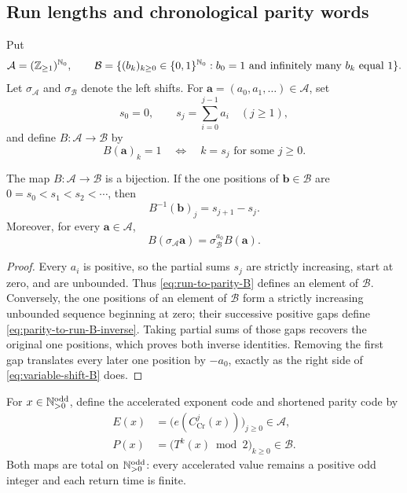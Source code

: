 \subsection{Run lengths and chronological parity words}

Put
\[
 \mathcal A=(\mathbb{Z}_{\geq1})^{\mathbb{N}_{0}},
 \qquad
 \mathcal B=\{(b_k)_{k\geq0}\in\{0,1\}^{\mathbb{N}_{0}}:
 b_0=1\text{ and infinitely many }b_k\text{ equal }1\}.
\]
Let $\sigma_{\mathcal A}$ and $\sigma_{\mathcal B}$ denote the left shifts.
For $\mathbf a=(a_0,a_1,\ldots)\in\mathcal A$, set
\[
 s_0=0,
 \qquad
 s_j=\sum_{i=0}^{j-1}a_i\quad(j\geq1),
\]
and define $B:\mathcal A\to\mathcal B$ by
\begin{equation}
\label{eq:run-to-parity-B}
 B(\mathbf a)_k=1
 \quad\Longleftrightarrow\quad
 k=s_j\text{ for some }j\geq0.
\end{equation}

\begin{proposition}
\label{prop:run-parity-isomorphism}
The map $B:\mathcal A\to\mathcal B$ is a bijection.  If the one positions of
$\mathbf b\in\mathcal B$ are
$0=s_0<s_1<s_2<\cdots$, then
\begin{equation}
\label{eq:parity-to-run-B-inverse}
 B^{-1}(\mathbf b)_j=s_{j+1}-s_j.
\end{equation}
Moreover, for every $\mathbf a\in\mathcal A$,
\begin{equation}
\label{eq:variable-shift-B}
 B(\sigma_{\mathcal A}\mathbf a)
 =\sigma_{\mathcal B}^{a_0}B(\mathbf a).
\end{equation}
\end{proposition}

\begin{proof}
Every $a_i$ is positive, so the partial sums $s_j$ are strictly increasing,
start at zero, and are unbounded.  Thus \eqref{eq:run-to-parity-B} defines an
element of $\mathcal B$.  Conversely, the one positions of an element of
$\mathcal B$ form a strictly increasing unbounded sequence beginning at zero;
their successive positive gaps define \eqref{eq:parity-to-run-B-inverse}.
Taking partial sums of those gaps recovers the original one positions, which
proves both inverse identities.  Removing the first gap translates every
later one position by $-a_0$, exactly as the right side of
\eqref{eq:variable-shift-B} does.
\end{proof}

For $x\in\mathbb{N}_{>0}^{\mathrm{odd}}$, define the accelerated exponent code and shortened parity
code by
\begin{align}
 E(x)&=\bigl(e(C_{\mathrm{Cr}}^j(x))\bigr)_{j\geq0}
       \in\mathcal A,
 \label{eq:E-accelerated-code}\\
 P(x)&=\bigl(T^k(x)\bmod2\bigr)_{k\geq0}
       \in\mathcal B.
 \label{eq:P-parity-code}
\end{align}
Both maps are total on $\mathbb{N}_{>0}^{\mathrm{odd}}$: every accelerated value remains a positive odd
integer and each return time is finite.

